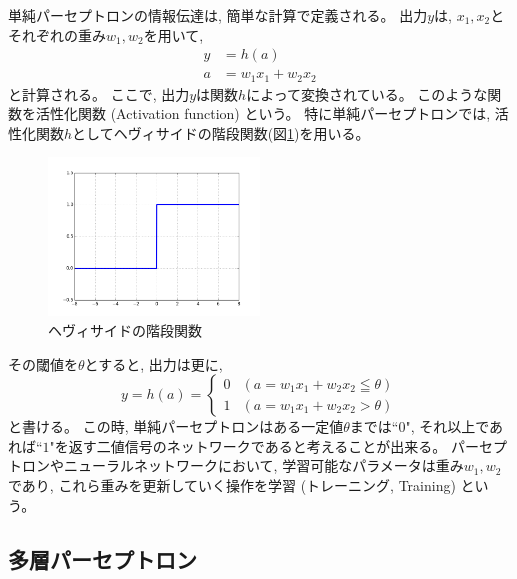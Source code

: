 単純パーセプトロンの情報伝達は, 簡単な計算で定義される。
出力$y$は, $x_1,x_2$とそれぞれの重み$w_1,w_2$を用いて, 
\begin{equation}
 \begin{split}
  y &= h(a)\\
  a &= w_1x_1 + w_2x_2
 \end{split}
\end{equation}
と計算される。
ここで, 出力$y$は関数$h$によって変換されている。
このような関数を活性化関数 (Activation function) という。
特に単純パーセプトロンでは, 活性化関数$h$としてヘヴィサイドの階段関数(図\ref{3HeavisideStepFunction})を用いる。

\begin{figure}[htbp]
 \centering
 \includegraphics[width=0.5\textwidth]{Figure/2DeepLearning/3HeavisideStepFunction.png}
 \caption{ヘヴィサイドの階段関数}
 \label{3HeavisideStepFunction}
\end{figure}

その閾値を$\theta$とすると, 出力は更に, 
\begin{equation}
 y = h(a) = \left\{ \begin{array}{ll}
    0 & (a = w_1x_1 + w_2x_2 \leqq \theta) \\
    1 & (a = w_1x_1 + w_2x_2 > \theta)
 \end{array} \right.
\end{equation}
と書ける。
この時, 単純パーセプトロンはある一定値$\theta$までは``$0$", それ以上であれば``$1$"を返す二値信号のネットワークであると考えることが出来る。
パーセプトロンやニューラルネットワークにおいて, 学習可能なパラメータは重み$w_1,w_2$であり, これら重みを更新していく操作を学習 (トレーニング, Training) という。


\subsection{多層パーセプトロン} \label{DL:Percep:MultiLayerPerceptron}

